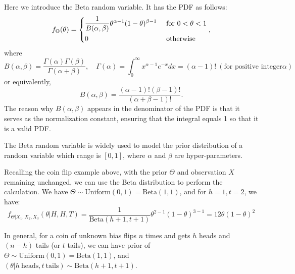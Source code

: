 Here we introduce the Beta random variable. It has the PDF as follows: 
\[
  f_{\Theta} (\theta) = \begin{dcases}
    \dfrac{1}{B(\alpha, \beta)} \theta^{\alpha-1} (1 - \theta)^{\beta - 1} &\text{ for } 0 < \theta < 1 \\
    0 &\text{ otherwise} 
  \end{dcases}, 
\]
where 
\[
  B(\alpha, \beta) = \dfrac{\Gamma(\alpha)\Gamma(\beta)}{\Gamma(\alpha + \beta)}, \quad \Gamma(\alpha) = \int_0^{\infty} x^{\alpha-1} e^{-x} dx = (\alpha - 1)!\ (\text{for positive integer} \alpha)
\]
or equivalently,
\[
  B(\alpha, \beta) = \dfrac{(\alpha - 1)!(\beta - 1)!}{(\alpha + \beta -1)!} .
\]
The reason why \(B(\alpha, \beta)\) appears in the denominator of the PDF is that it serves as the normalization constant, ensuring that the integral equals 1 so that it is a valid PDF.

The Beta random variable is widely used to model the prior distribution of a random variable which range is \([0, 1]\), where \(\alpha\) and \(\beta\) are hyper-parameters. 

Recalling the coin flip example above, with the prior \(\Theta\) and observation \(X\) remaining unchanged, we can use the Beta distribution to perform the calculation. We have \(\Theta \sim \text{Uniform}(0, 1) = \text{Beta}(1, 1)\), and for \(h = 1, t = 2\), we have:
\[
  f_{\Theta \vert X_1, X_2, X_3} (\theta \vert H,H,T) = \dfrac{1}{\text{Beta}(h + 1, t + 1)} \theta^{2-1} (1 - \theta)^{3 - 1} = 12\theta (1 - \theta)^2
\]

In general, for a coin of unknown bias flips \(n\) times and gets \(h\) heads and \((n - h)\) tails (or \(t\) tails), we can have prior of \(\Theta \sim \text{Uniform}(0, 1) = \text{Beta}(1, 1)\), and \((\theta \vert h\ \text{heads}, t\ \text{tails}) \sim \text{Beta} (h + 1, t + 1)\). 

